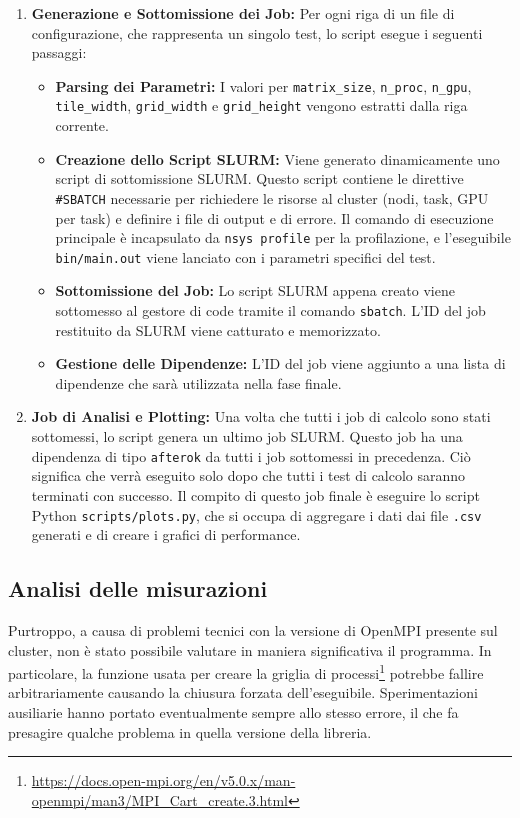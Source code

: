 \begin{enumerate}
    \item \textbf{Generazione e Sottomissione dei Job:} Per ogni riga di un file di configurazione, che rappresenta un singolo test, lo script esegue i seguenti passaggi:
          \begin{itemize}
              \item \textbf{Parsing dei Parametri:} I valori per \texttt{matrix\_size}, \texttt{n\_proc}, \texttt{n\_gpu}, \texttt{tile\_width}, \texttt{grid\_width} e \texttt{grid\_height} vengono estratti dalla riga corrente.
              \item \textbf{Creazione dello Script SLURM:} Viene generato dinamicamente uno script di sottomissione SLURM. Questo script contiene le direttive \texttt{\#SBATCH} necessarie per richiedere le risorse al cluster (nodi, task, GPU per task) e definire i file di output e di errore. Il comando di esecuzione principale è incapsulato da \texttt{nsys profile} per la profilazione, e l'eseguibile \texttt{bin/main.out} viene lanciato con i parametri specifici del test.
              \item \textbf{Sottomissione del Job:} Lo script SLURM appena creato viene sottomesso al gestore di code tramite il comando \texttt{sbatch}. L'ID del job restituito da SLURM viene catturato e memorizzato.
              \item \textbf{Gestione delle Dipendenze:} L'ID del job viene aggiunto a una lista di dipendenze che sarà utilizzata nella fase finale.
          \end{itemize}

    \item \textbf{Job di Analisi e Plotting:} Una volta che tutti i job di calcolo sono stati sottomessi, lo script genera un ultimo job SLURM. Questo job ha una dipendenza di tipo \texttt{afterok} da tutti i job sottomessi in precedenza. Ciò significa che verrà eseguito solo dopo che tutti i test di calcolo saranno terminati con successo. Il compito di questo job finale è eseguire lo script Python \texttt{scripts/plots.py}, che si occupa di aggregare i dati dai file \texttt{.csv} generati e di creare i grafici di performance.
\end{enumerate}

\subsection{Analisi delle misurazioni}
Purtroppo, a causa di problemi tecnici con la versione di OpenMPI presente sul cluster, non è stato possibile valutare in maniera significativa il programma. In particolare, la funzione usata per creare la griglia di processi\footnote{\url{https://docs.open-mpi.org/en/v5.0.x/man-openmpi/man3/MPI_Cart_create.3.html}} potrebbe fallire arbitrariamente causando la chiusura forzata dell'eseguibile. Sperimentazioni ausiliarie hanno portato eventualmente sempre allo stesso errore, il che fa presagire qualche problema in quella versione della libreria.

